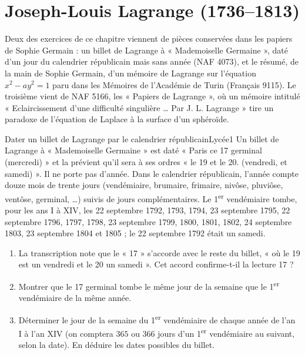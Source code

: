 \documentclass[11pt,a4paper]{article}
\begin{document}
\section*{Joseph-Louis Lagrange (1736--1813)}

Deux des exercices de ce chapitre viennent de pièces conservées dans les papiers
de Sophie Germain : un billet de Lagrange à « Mademoiselle Germaine », daté d'un
jour du calendrier républicain mais sans année (NAF 4073), et le résumé, de la
main de Sophie Germain, d'un mémoire de Lagrange sur l'équation $x^2 - ay^2 = 1$
paru dans les Mémoires de l'Académie de Turin (Français 9115). Le troisième vient
de NAF 5166, les « Papiers de Lagrange », où un mémoire intitulé « Eclaircissement
d'une difficulté singulière … Par J. L. Lagrange » tire un paradoxe de l'équation
de Laplace à la surface d'un sphéroïde.

\begin{exercice}{Dater un billet de Lagrange par le calendrier républicain}{Lycée}{1}
Un billet de Lagrange à « Mademoiselle Germaine » est daté « Paris ce 17 germinal
(mercredi) » et la prévient qu'il sera à ses ordres « le 19 et le 20. (vendredi, et
samedi) ». Il ne porte pas d'année. Dans le calendrier républicain, l'année compte
douze mois de trente jours (vendémiaire, brumaire, frimaire, nivôse, pluviôse,
ventôse, germinal, \ldots) suivis de jours complémentaires. Le 1\textsuperscript{er}
vendémiaire tombe, pour les ans I à XIV, les 22 septembre 1792, 1793, 1794, 23 septembre
1795, 22 septembre 1796, 1797, 1798, 23 septembre 1799, 1800, 1801, 1802, 24 septembre 1803,
23 septembre 1804 et 1805 ; le 22 septembre 1792 était un samedi.
\begin{enumerate}
\item La transcription note que le « 17 » s'accorde avec le reste du billet, « où le
  19 est un vendredi et le 20 un samedi ». Cet accord confirme-t-il la lecture 17 ?
\item Montrer que le 17 germinal tombe le même jour de la semaine que le
  1\textsuperscript{er} vendémiaire de la même année.
\item Déterminer le jour de la semaine du 1\textsuperscript{er} vendémiaire de chaque
  année de l'an I à l'an XIV (on comptera $365$ ou $366$ jours d'un
  1\textsuperscript{er} vendémiaire au suivant, selon la date). En déduire les dates
  possibles du billet.
\end{enumerate}
\end{exercice}
\end{document}
